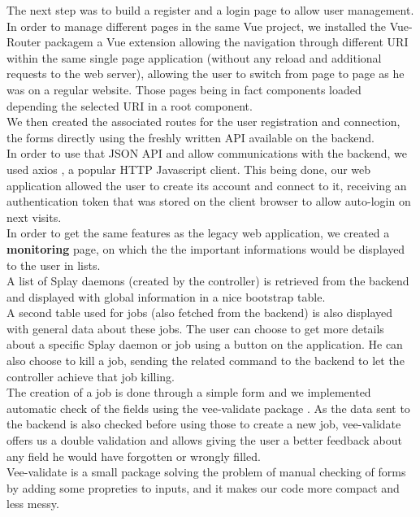 \documentclass{eplmastersthesis}
\begin{document}
        The next step was to build a register and a login page to allow
        user management. In order to manage different pages in the same Vue
        project, we installed the Vue-Router packagem a Vue extension
        allowing the navigation through different URI within the same
        single page application (without any reload and additional requests
        to the web server), allowing the user to switch from page to page
        as he was on a regular website. Those pages being in fact components
        loaded depending the selected URI in a root component.\\
        We then created the associated routes for the user registration and
        connection, the forms directly using the freshly written API available
        on the backend.\\
        In order to use that JSON API and allow communications with the
        backend, we used axios \cite{axios}, a popular HTTP Javascript client.
        This being done, our web application allowed the user to create its
        account and connect to it, receiving an authentication token that
        was stored on the client browser to allow auto-login on next visits.\\

        In order to get the same features as the legacy web application,
        we created a \textbf{monitoring} page, on which the the important
        informations would be displayed to the user in lists.\\
        A list of Splay daemons (created by the controller) is retrieved
        from the backend and displayed with global information in a nice
        bootstrap table.\\
        A second table used for jobs (also fetched from the backend) is also
        displayed with general data about these jobs. The user can choose to
        get more details about a specific Splay daemon or job using a button
        on the application. He can also choose to kill a job, sending the
        related command to the backend to let the controller achieve that job
        killing.\\
        The creation of a job is done through a simple form and we implemented
        automatic check of the fields using the vee-validate package
        \cite{VeeValidate}. As the data sent to the backend is also checked
        before using those to create a new job, vee-validate offers us
        a double validation and allows giving the user a better feedback
        about any field he would have forgotten or wrongly filled.\\
        Vee-validate is a small package solving the problem of
        manual checking of forms by adding some propreties to inputs, and it
        makes our code more compact and less messy.
\end{document}
